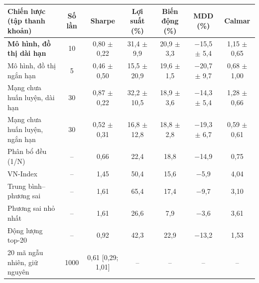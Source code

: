 \begin{tabular}{@{}lcccccc@{}}
\toprule
Chiến lược (tập thanh khoản) & Số lần & Sharpe & Lợi suất (\%) & Biến động (\%) & MDD (\%) & Calmar \\
\midrule
\textbf{Mô hình, đồ thị dài hạn} & 10 & 0{,}80 $\pm$ 0{,}22 & 31{,}4 $\pm$ 9{,}9 & 20{,}9 $\pm$ 3{,}3 & $-$15{,}5 $\pm$ 5{,}4 & 1{,}15 $\pm$ 0{,}65 \\
Mô hình, đồ thị ngắn hạn & 5 & 0{,}46 $\pm$ 0{,}50 & 15{,}5 $\pm$ 20{,}9 & 19{,}6 $\pm$ 1{,}5 & $-$20{,}7 $\pm$ 9{,}7 & 0{,}68 $\pm$ 1{,}00 \\
Mạng chưa huấn luyện, dài hạn & 30 & 0{,}87 $\pm$ 0{,}22 & 32{,}2 $\pm$ 10{,}5 & 18{,}9 $\pm$ 3{,}6 & $-$14{,}3 $\pm$ 5{,}4 & 1{,}28 $\pm$ 0{,}66 \\
Mạng chưa huấn luyện, ngắn hạn & 30 & 0{,}52 $\pm$ 0{,}31 & 16{,}8 $\pm$ 12{,}8 & 18{,}8 $\pm$ 2{,}8 & $-$19{,}3 $\pm$ 6{,}7 & 0{,}59 $\pm$ 0{,}61 \\
\midrule
Phân bổ đều (1/N) & -- & 0{,}66 & 22{,}4 & 18{,}8 & $-$14{,}9 & 0{,}75 \\
VN-Index & -- & 1{,}45 & 50{,}4 & 15{,}6 & $-$5{,}9 & 4{,}04 \\
Trung bình--phương sai & -- & 1{,}61 & 65{,}4 & 17{,}4 & $-$9{,}7 & 3{,}10 \\
Phương sai nhỏ nhất & -- & 1{,}61 & 26{,}6 & 7{,}9 & $-$3{,}6 & 3{,}61 \\
Động lượng top-20 & -- & 0{,}92 & 42{,}3 & 22{,}9 & $-$13{,}2 & 1{,}53 \\
20 mã ngẫu nhiên, giữ nguyên & 1000 & 0{,}61 [0{,}29; 1{,}01] & -- & -- & -- & -- \\
\bottomrule
\end{tabular}
